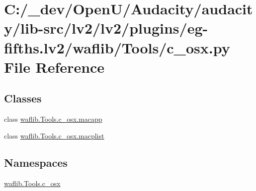 \hypertarget{lv2_2plugins_2eg-fifths_8lv2_2waflib_2_tools_2c__osx_8py}{}\section{C\+:/\+\_\+dev/\+Open\+U/\+Audacity/audacity/lib-\/src/lv2/lv2/plugins/eg-\/fifths.lv2/waflib/\+Tools/c\+\_\+osx.py File Reference}
\label{lv2_2plugins_2eg-fifths_8lv2_2waflib_2_tools_2c__osx_8py}
\subsection*{Classes}
\begin{DoxyCompactItemize}
\item 
class \hyperlink{classwaflib_1_1_tools_1_1c__osx_1_1macapp}{waflib.\+Tools.\+c\+\_\+osx.\+macapp}
\item 
class \hyperlink{classwaflib_1_1_tools_1_1c__osx_1_1macplist}{waflib.\+Tools.\+c\+\_\+osx.\+macplist}
\end{DoxyCompactItemize}
\subsection*{Namespaces}
\begin{DoxyCompactItemize}
\item 
 \hyperlink{namespacewaflib_1_1_tools_1_1c__osx}{waflib.\+Tools.\+c\+\_\+osx}
\end{DoxyCompactItemize}
